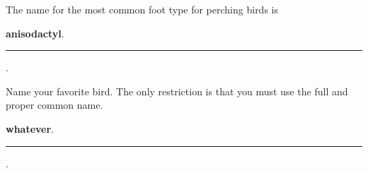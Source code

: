 \documentclass[12pt, addpoints]{exam}
\begin{document}
\begin{questions}
\bonusquestion[]
The name for the most common foot type for perching birds is

\bigskip

\ifprintanswers \textbf{anisodactyl}. \else \rule{2.5in}{0.4pt}. \fi


\vspace{2\baselineskip}

\bonusquestion[]
Name your favorite bird. The only restriction is that you must use the full and proper common name.

\bigskip

\ifprintanswers \textbf{whatever}. \else \rule{2.5in}{0.4pt}. \fi



\end{questions}
\end{document}
